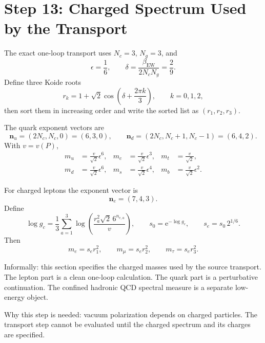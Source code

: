 \documentclass[11pt]{article}
\theoremstyle{remark}
\newcommand{\e}{\mathrm e}
\newcommand{\Nc}{N_c}
\newcommand{\Ng}{N_g}
\begin{document}
\section{Step 13: Charged Spectrum Used by the Transport}

The exact one-loop transport uses \(\Nc=3\), \(\Ng=3\), and
\begin{equation}
\epsilon=\frac16,
\qquad
\delta=\frac{\beta_{\mathrm{EW}}}{2\Nc\Ng}
=\frac{2}{9}.
\label{eq:epsdelta}
\end{equation}
Define three Koide roots
\begin{equation}
r_k=1+\sqrt2\cos\!\left(\delta+\frac{2\pi k}{3}\right),
\qquad k=0,1,2,
\label{eq:koide}
\end{equation}
then sort them in increasing order and write the sorted list as
\((r_1,r_2,r_3)\).

The quark exponent vectors are
\begin{equation}
\bm n_u=(2\Nc,\Nc,0)=(6,3,0),
\qquad
\bm n_d=(2\Nc,\Nc+1,\Nc-1)=(6,4,2).
\label{eq:quarkexponents}
\end{equation}
With \(v=v(P)\),
\begin{align}
m_u&=\frac{v}{\sqrt2}\epsilon^6,
&
m_c&=\frac{v}{\sqrt2}\epsilon^3,
&
m_t&=\frac{v}{\sqrt2},\\
m_d&=\frac{v}{\sqrt2}\epsilon^6,
&
m_s&=\frac{v}{\sqrt2}\epsilon^4,
&
m_b&=\frac{v}{\sqrt2}\epsilon^2.
\label{eq:quarkmasses}
\end{align}

For charged leptons the exponent vector is
\begin{equation}
\bm n_e=(7,4,3).
\label{eq:lepexp}
\end{equation}
Define
\begin{equation}
\log g_c
=
\frac{1}{3}
\sum_{a=1}^3
\log\!\left(
\frac{r_a^2\sqrt2\,6^{n_{e,a}}}{v}
\right),
\qquad
s_0=\e^{-\log g_c},
\qquad
s_e=s_0\,2^{1/6}.
\label{eq:lepscale}
\end{equation}
Then
\begin{equation}
m_e=s_e r_1^2,
\qquad
m_\mu=s_e r_2^2,
\qquad
m_\tau=s_e r_3^2.
\label{eq:lepmasses}
\end{equation}

Informally: this section specifies the charged masses used by the source transport. The lepton part is a clean one-loop calculation. The quark part is a perturbative continuation. The confined hadronic QCD spectral measure is a separate low-energy object.

Why this step is needed: vacuum polarization depends on charged particles. The transport step cannot be evaluated until the charged spectrum and its charges are specified.
\end{document}
